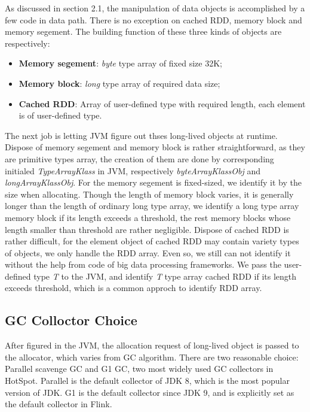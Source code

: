 \documentclass[sigplan, screen]{acmart}
\begin{document}
As discussed in section 2.1, the manipulation of data objects is accomplished by a few code in data path. There is no exception on cached RDD, memory block and memory segement.
The building function of these three kinds of objects are respectively:  
\begin{itemize}
  \item \textbf{Memory segement}: \emph{byte} type array of fixed size 32K;
  \item \textbf{Memory block}: \emph{long} type array of required data size;
  \item \textbf{Cached RDD}: Array of user-defined type with required length, each element is of user-defined type.
\end{itemize}

The next job is letting JVM figure out thses long-lived objects at runtime. Dispose of memory segement and memory block is rather straightforward, as they are primitive types array, 
the creation of them are done by corresponding initialed \emph{TypeArrayKlass} in JVM, respectively \emph{byteArrayKlassObj} and \emph{longArrayKlassObj}. For the memory segement 
is fixed-sized, we identify it by the size when allocating. Though the length of memory block varies, it is generally longer than the length of ordinary long type array, we identify a long type array memory
block if its length exceeds a threshold, the rest memory blocks whose length smaller than threshold are rather negligible. Dispose of cached RDD is rather difficult, for the element object of cached RDD may contain 
variety types of objects, we only handle the RDD array. Even so, we still can not identify it without the help from code of big data processing frameworks. We pass the user-defined type \emph{T}
 to the JVM, and identify \emph{T} type array cached RDD if its length exceeds threshold, which is a common approch to identify RDD array\cite{wang2019panthera}.         

\subsection{GC Colloctor Choice}
After figured in the JVM, the allocation request of long-lived object is passed to the allocator, which varies from GC algorithm. There are two reasonable choice: 
Parallel scavenge GC and G1 GC, two most widely used GC collectors in HotSpot. Parallel is the default collector of JDK 8, which is the most popular version of JDK. 
G1 is the default collector since JDK 9, and is explicitly set as the default collector in Flink.
\end{document}
